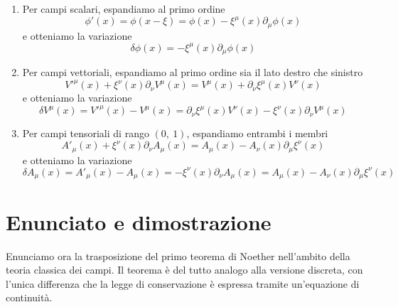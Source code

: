     \begin{enumerate}
        \item Per campi scalari, espandiamo al primo ordine
    \begin{equation*}
        \phi'(x) = \phi(x - \xi) = \phi(x) - \xi^\mu(x) \partial_\mu \phi(x)
    \end{equation*}  
        e otteniamo la variazione
    \begin{equation}\label{variazionescalare}
        \delta \phi(x) = - \xi^\mu(x) \partial_\mu \phi(x)
    \end{equation} 
        \item Per campi vettoriali, espandiamo al primo ordine sia il lato destro che sinistro
    \begin{equation*}
        V'^\mu(x) + \xi^\nu(x) \partial_\nu V^\mu (x) = V^\mu(x) + \partial_\nu \xi^\mu(x) V^\nu(x)
    \end{equation*}
        e otteniamo la variazione
    \begin{equation}\label{variazionevett}
        \delta V^\mu(x) = V'^\mu(x) - V^\mu(x) = \partial_\nu \xi^\mu(x) V^\nu(x) - \xi^\nu (x)\partial_\nu V^\mu(x)
    \end{equation}
        \item Per campi tensoriali di rango $(0,~1)$, espandiamo entrambi i membri 
    \begin{equation*}
        A'_\mu(x) + \xi^\nu(x) \partial_\nu A_\mu (x) = A_\mu(x) - A_\nu(x) \partial_\mu \xi^\nu(x)
    \end{equation*}
        e otteniamo la variazione
    \begin{equation}\label{variazione10}
        \delta A_\mu(x) = A'_\mu(x) - A_\mu(x) = - \xi^\nu(x) \partial_\nu A_\mu (x) = A_\mu(x) - A_\nu(x) \partial_\mu \xi^\nu(x)
    \end{equation}
    \end{enumerate}

\section{Enunciato e dimostrazione}
    Enunciamo ora la trasposizione del primo teorema di Noether nell'ambito della teoria classica dei campi. Il teorema è del tutto analogo alla versione discreta, con l'unica differenza che la legge di conservazione è espressa tramite un'equazione di continuità.

